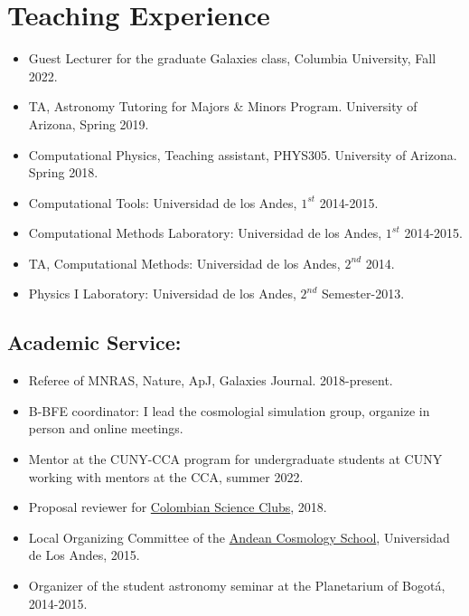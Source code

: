 \documentclass[UTF8]{article}
\begin{document}
\section*{Teaching Experience}

\begin{itemize}
  \setlength\itemsep{0.0em}
  \renewcommand\labelitemi{$\cdot$}
\item Guest Lecturer for the graduate Galaxies class, Columbia University, Fall 2022.
\item TA, Astronomy Tutoring for Majors \& Minors Program. University of Arizona, Spring 2019. 
\item Computational Physics, Teaching assistant, PHYS305. University of Arizona. Spring 2018.
\item Computational Tools: Universidad de los Andes, $1^{st}$ 2014-2015.
\item Computational Methods Laboratory: Universidad de los Andes, $1^{st}$ 2014-2015.
\item TA, Computational Methods: Universidad de los Andes, $2^{nd}$ 2014.
\item Physics I Laboratory: Universidad de los Andes, $2^{nd}$ Semester-2013.
\end{itemize}


\subsection*{Academic Service:} 

\begin{itemize}
  \setlength\itemsep{0.0em}
  \renewcommand\labelitemi{$\cdot$}
\item Referee of MNRAS, Nature, ApJ, Galaxies Journal. 2018-present.
\item B-BFE coordinator: I lead the cosmologial simulation group, organize in person and online meetings.
\item Mentor at the CUNY-CCA program for undergraduate students at CUNY working with mentors at the CCA, summer 2022. 
\item Proposal reviewer for \href{https://clubesdeciencia.co/}{Colombian Science Clubs}, 2018.
\item Local Organizing Committee of the \href{http://forero.github.io/AndeanCosmologySchool/}{Andean Cosmology School}, Universidad de Los Andes, 2015.
\item Organizer of the student astronomy seminar at the Planetarium of Bogot\'a, 2014-2015.
\end{itemize}
\end{document}
